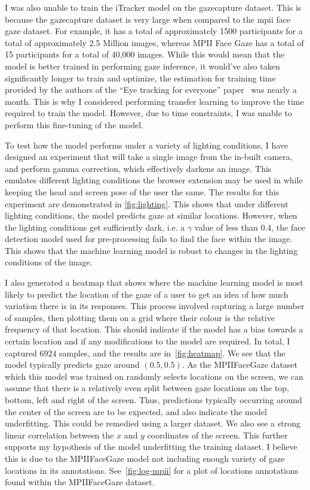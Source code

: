 \documentclass{report}
\begin{document}
I was also unable to train the iTracker model on the gazecapture dataset. This is because the gazecapture dataset is very large when compared to the mpii face gaze dataset. For example, it has a total of approximately 1500 participants for a total of approximately 2.5 Million images, whereas MPII Face Gaze has a total of 15 participants for a total of 40,000 images. While this would mean that the model is better trained in performing gaze inference, it would've also taken significantly longer to train and optimize, the estimation for training time provided by the authors of the ``Eye tracking for everyone'' paper~\cite{krafka2016eye} was nearly a month. This is why I considered performing transfer learning to improve the time required to train the model. However, due to time constraints, I was unable to perform this fine-tuning of the model.

To test how the model performs under a variety of lighting conditions, I have designed an experiment that will take a single image from the in-built camera, and perform gamma correction, which effectively darkens an image. This emulates different lighting conditions the browser extension may be used in while keeping the head and screen pose of the user the same. The results for this experiment are demonstrated in \autoref{fig:lighting}. This shows that under different lighting conditions, the model predicts gaze at similar locations. However, when the lighting conditions get sufficiently dark, i.e. a $\gamma$ value of less than 0.4, the face detection model used for pre-processing fails to find the face within the image. This shows that the machine learning model is robust to changes in the lighting conditions of the image. 

I also generated a heatmap that shows where the machine learning model is most likely to predict the location of the gaze of a user to get an idea of how much variation there is in its responses. This process involved capturing a large number of samples, then plotting them on a grid where their colour is the relative frequency of that location. This should indicate if the model has a bias towards a certain location and if any modifications to the model are required. In total, I captured $6924$ samples, and the results are in~\autoref{fig:heatmap}. We see that the model typically predicts gaze around $(0.5, 0.5)$. As the MPIIFaceGaze dataset which this model was trained on randomly selects locations on the screen, we can assume that there is a relatively even split between gaze locations on the top, bottom, left and right of the screen. Thus, predictions typically occurring around the center of the screen are to be expected, and also indicate the model underfitting. This could be remedied using a larger dataset. We also see a strong linear correlation between the $x$ and $y$ coordinates of the screen. This further supports my hypothesis of the model underfitting the training dataset. I believe this is due to the MPIIFaceGaze model not including enough variety of gaze locations in its annotations. See~\autoref{fig:log-mpii} for a plot of locations annotations found within the MPIIFaceGaze dataset.
\end{document}
